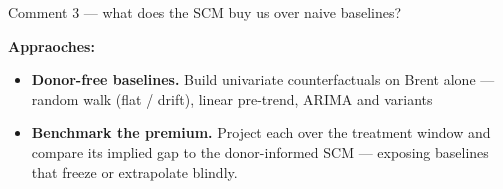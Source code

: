 \documentclass[aspectratio=169,11pt]{beamer}
\newcommand{\hd}[1]{\textbf{#1}}
\begin{document}

\begin{frame}{Comment 3 --- what does the SCM buy us over naive baselines?}
  \footnotesize
  \vspace{0.3em}
  \begin{center}
  \end{center}

  \vspace{0.8em}
  \hd{Appraoches:}
  \vspace{0.3em}
  \begin{itemize}\setlength\itemsep{0.5em}
    \item[\textcolor{accent}{\hd{1}}] \hd{Donor-free baselines.} Build univariate counterfactuals on Brent alone ---
      random walk (flat / drift), linear pre-trend, ARIMA and variants
    \item[\textcolor{accent}{\hd{2}}] \hd{Benchmark the premium.} Project each over the treatment window and compare
      its implied gap to the donor-informed SCM --- exposing baselines that freeze or extrapolate blindly.
  \end{itemize}
\end{frame}
\end{document}

